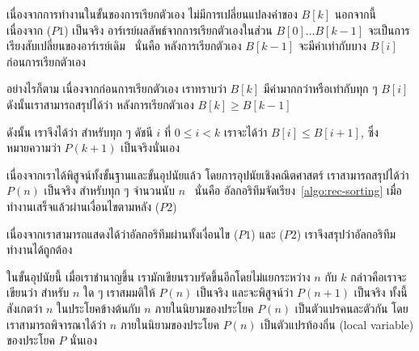 เนื่องจาก{\wbr}การ{\wbr}ทำงาน{\wbr}ใน{\wbr}ขั้น{\wbr}ของ{\wbr}การ{\wbr}เรียก{\wbr}ตัวเอง ไม่{\wbr}มี{\wbr}การ{\wbr}เปลี่ยนแปลง{\wbr}ค่า{\wbr}ของ $B[k]$ นอกจากนี้{\wbr}
เนื่องจาก ($P1$) เป็นจริง อาร์เรย์ผลลัพธ์{\wbr}จาก{\wbr}การ{\wbr}เรียก{\wbr}ตัวเอง{\wbr}ใน{\wbr}ส่วน $B[0]\ldots
B[k-1]$ จะ{\wbr}เป็น{\wbr}การ{\wbr}เรียง{\wbr}สับเปลี่ยน{\wbr}ของ{\wbr}อาร์เรย์{\wbr}เดิม \ นั่น{\wbr}คือ หลัง{\wbr}การ{\wbr}เรียก{\wbr}ตัวเอง{\wbr}
$B[k-1]$ จะ{\wbr}มี{\wbr}ค่า{\wbr}เท่า{\wbr}กับ{\wbr}บาง $B[i]$ ก่อน{\wbr}การ{\wbr}เรียก{\wbr}ตัวเอง{\wbr}

อย่างไรก็ตาม เนื่องจาก{\wbr}ก่อน{\wbr}การ{\wbr}เรียก{\wbr}ตัวเอง เรา{\wbr}ทราบ{\wbr}ว่า $B[k]$ มี{\wbr}ค่า{\wbr}มาก{\wbr}กว่า{\wbr}หรือ{\wbr}เท่า{\wbr}กับ{\wbr}ทุก{\wbr}
ๆ $B[i]$ ดังนั้น{\wbr}เรา{\wbr}สามารถ{\wbr}สรุป{\wbr}ได้{\wbr}ว่า หลัง{\wbr}การ{\wbr}เรียก{\wbr}ตัวเอง $B[k]\geq B[k-1]$

ดังนั้น เรา{\wbr}จึง{\wbr}ได้{\wbr}ว่า สำหรับ{\wbr}ทุก ๆ ดัชนี $i$ ที่ $0\leq i<k$ เรา{\wbr}จะ{\wbr}ได้{\wbr}ว่า $B[i]\leq
B[i+1]$, ซึ่ง{\wbr}หมายความ{\wbr}ว่า $P(k+1)$ เป็นจริง{\wbr}นั่นเอง{\wbr}

เนื่องจาก{\wbr}เรา{\wbr}ได้{\wbr}พิสูจน์{\wbr}ทั้ง{\wbr}ขั้น{\wbr}ฐาน{\wbr}และ{\wbr}ขั้น{\wbr}อุปนัย{\wbr}แล้ว โดย{\wbr}การ{\wbr}อุปนัย{\wbr}เชิง{\wbr}คณิตศาสตร์{\wbr}
เรา{\wbr}สามารถ{\wbr}สรุป{\wbr}ได้{\wbr}ว่า $P(n)$ เป็นจริง สำหรับ{\wbr}ทุก ๆ จำนวนนับ $n$ \ นั่น{\wbr}คือ{\wbr}
อัล{\wbr}กอ{\wbr}ริ{\wbr}ทึม{\wbr}จัดเรียง~\ref{algo:rec-sorting} เมื่อ{\wbr}ทำงาน{\wbr}เสร็จ{\wbr}แล้ว{\wbr}ผ่าน{\wbr}เงื่อนไข{\wbr}ตาม{\wbr}หลัง{\wbr}
($P2$)

เนื่องจาก{\wbr}เรา{\wbr}สามารถ{\wbr}แสดง{\wbr}ได้{\wbr}ว่า{\wbr}อัล{\wbr}กอ{\wbr}ริ{\wbr}ทึม{\wbr}ผ่าน{\wbr}ทั้ง{\wbr}เงื่อนไข ($P1$) และ ($P2$)
เรา{\wbr}จึง{\wbr}สรุป{\wbr}ว่า{\wbr}อัล{\wbr}กอ{\wbr}ริ{\wbr}ทึม{\wbr}ทำงาน{\wbr}ได้{\wbr}ถูกต้อง{\wbr}

ใน{\wbr}ขั้น{\wbr}อุปนัย{\wbr}นี้ เมื่อ{\wbr}เรา{\wbr}ชำนาญ{\wbr}ขึ้น เรา{\wbr}มัก{\wbr}เขียน{\wbr}รวบรัด{\wbr}ขึ้น{\wbr}อีก{\wbr}โดย{\wbr}ไม่{\wbr}แยก{\wbr}ระหว่าง $n$ กับ $k$
กล่าวคือ{\wbr}เรา{\wbr}จะ{\wbr}เขียน{\wbr}ว่า สำหรับ $n$ ใด ๆ เรา{\wbr}สมมติ{\wbr}ให้ $P(n)$ เป็นจริง และ{\wbr}จะ{\wbr}พิสูจน์{\wbr}ว่า{\wbr}
$P(n+1)$ เป็นจริง ทั้งนี้{\wbr}สังเกต{\wbr}ว่า $n$ ใน{\wbr}ประโยค{\wbr}ข้างต้น{\wbr}กับ $n$ ภายใน{\wbr}นิยาม{\wbr}ของ{\wbr}ประโยค{\wbr}
$P(n)$ เป็น{\wbr}ตัวแปร{\wbr}คน{\wbr}ละ{\wbr}ตัว{\wbr}กัน โดย{\wbr}เรา{\wbr}สามารถ{\wbr}พิจารณา{\wbr}ได้{\wbr}ว่า $n$ ภายใน{\wbr}นิยาม{\wbr}ของ{\wbr}ประโยค{\wbr}
$P(n)$ เป็น{\wbr}ตัวแปร{\wbr}ท้องถิ่น (local variable) ของ{\wbr}ประโยค $P$ นั่นเอง{\wbr}

